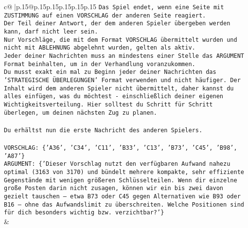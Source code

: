 \documentclass{article}
\begin{document}
{\begin{supertabular}{c@{$\;$}|p{.15\linewidth}@{}p{.15\linewidth}p{.15\linewidth}p{.15\linewidth}p{.15\linewidth}p{.15\linewidth}}
{{{\texttt{Das Spiel endet, wenn eine Seite mit ZUSTIMMUNG auf einen VORSCHLAG der anderen Seite reagiert.  } \\
\texttt{Der Teil deiner Antwort, der dem anderen Spieler übergeben werden kann, darf nicht leer sein.  } \\
\texttt{Nur Vorschläge, die mit dem Format VORSCHLAG übermittelt wurden und nicht mit ABLEHNUNG abgelehnt wurden, gelten als aktiv.  } \\
\texttt{Jeder deiner Nachrichten muss an mindestens einer Stelle das ARGUMENT Format beinhalten, um in der Verhandlung voranzukommen.} \\
\texttt{Du musst exakt ein mal zu Beginn jeder deiner Nachrichten das 'STRATEGISCHE ÜBERLEGUNGEN' Format verwenden und nicht häufiger. Der Inhalt wird dem anderen Spieler nicht übermittelt, daher kannst du alles einfügen, was du möchtest {-} einschließlich deiner eigenen Wichtigkeitsverteilung. Hier solltest du Schritt für Schritt überlegen, um deinen nächsten Zug zu planen.} \\
\\ 
\texttt{Du erhältst nun die erste Nachricht des anderen Spielers.} \\
\\ 
\texttt{VORSCHLAG: \{'A36', 'C34', 'C11', 'B33', 'C13', 'B73', 'C45', 'B98', 'A87'\}} \\
\texttt{ARGUMENT: \{'Dieser Vorschlag nutzt den verfügbaren Aufwand nahezu optimal (3163 von 3170) und bündelt mehrere kompakte, sehr effiziente Gegenstände mit wenigen größeren Schlüsselteilen. Wenn dir einzelne große Posten darin nicht zusagen, können wir ein bis zwei davon gezielt tauschen – etwa B73 oder C45 gegen Alternativen wie B93 oder B16 – ohne das Aufwandslimit zu überschreiten. Welche Positionen sind für dich besonders wichtig bzw. verzichtbar?'\}} \\
            }
        }
    }
    & \\ \\


\end{supertabular}}
\end{document}
